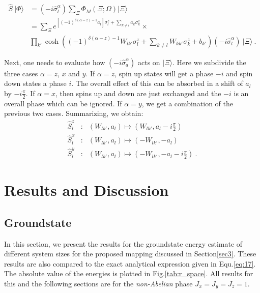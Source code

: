 \documentclass{article}
\begin{document}
\begin{equation}\label{eq:29_1}
	\begin{aligned}
		\hat{S}~|\Phi\rangle &= (-i\hat{\sigma}^{\alpha}_l)\sum_{\Xi}\Phi_{M}(\Xi;\Omega)|\Xi\rangle\\
		&= \sum_{\Xi} e^{[(-1)^{\delta(\alpha-z)-1} a_l]\sigma^{z}_l + \sum_{k\neq l} a_k \sigma_k^z} \times \\ &\prod_{k'} \cosh \left((-1)^{\delta(\alpha-z)-1} W_{lk'} \sigma_l^z + \sum_{k\neq l} W_{kk'} \sigma_k^z + b_{k'} \right) (-i\hat{\sigma}^{\alpha}_l)~|\Xi\rangle~.
	\end{aligned}
\end{equation}

Next, one needs to evaluate how $(-i \hat{\sigma}^{\alpha}_a)$ acts on $|\Xi\rangle$. Here we subdivide the three cases $\alpha =z$, $x$ and $y$. If $\alpha =z$, spin up states will get a phase $-i$ and spin down states a phase $i$. The overall effect of this can be absorbed in a shift of $a_l$ by $-i \frac{\pi}{2}$. If $\alpha=x$, then spins up and down are just exchanged and the $-i$ is an overall phase which can be ignored. If $\alpha = y$, we get a combination of the previous two cases. Summarizing, we obtain:
\begin{eqnarray}
	\hat{S}^z_l & : & \left(W_{lk'},a_l\right) \mapsto \left(W_{lk'},a_l- i \frac{\pi}{2}\right) \nonumber \\	
	\hat{S}^x_l & : & \left(W_{lk'},a_l\right) \mapsto \left(-W_{lk'},-a_l\right) \nonumber \\
	\hat{S}^y_l & : & \left(W_{lk'},a_l\right) \mapsto \left(-W_{lk'},-a_l-i \frac{\pi}{2}\right)~.
\end{eqnarray}

\section{Results and Discussion}\label{sec5}

\subsection{Groundstate}

In this section, we present the results for the groundstate energy estimate of different system sizes for the proposed mapping discussed in Section\hspace{0.2mm}\ref{sec3}. These results are also compared to the exact analytical expression given in Equ.\hspace{0.2mm}\ref{eq:17}. The absolute value of the energies is plotted in Fig.\hspace{0.2mm}\ref{tab:r_space}. All results for this and the following sections are for the \textit{non-Abelian} phase $J_x = J_y = J_z = 1$.
\end{document}
